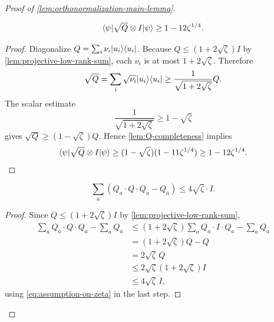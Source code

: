\begin{proof}[Proof of \ref{lem:orthonormalization-main-lemma}]
	\begin{lemma}\label{lem:sqrt-Q-completeness}
		\leanok
		\begin{equation*}
			\langle \psi \rvert \sqrt{Q} \otimes I \lvert \psi \rangle
			\geq
			1 - 12 \zeta^{1/4}.
		\end{equation*}
	\end{lemma}
	\begin{proof}
		\leanok
		Diagonalize $Q=\sum_i \nu_i \lvert u_i \rangle\langle u_i \rvert$. Because $Q \leq (1+2\sqrt{\zeta})I$ by \ref{lem:projective-low-rank-sum}, each $\nu_i$ is at most $1+2\sqrt{\zeta}$. Therefore
		\[
			\sqrt{Q}
			=
			\sum_i \sqrt{\nu_i}\lvert u_i \rangle\langle u_i \rvert
			\geq
			\frac{1}{\sqrt{1+2\sqrt{\zeta}}} Q.
		\]
		The scalar estimate
		\[
			\frac{1}{\sqrt{1+2\sqrt{\zeta}}} \geq 1-\sqrt{\zeta}
		\]
		gives $\sqrt{Q} \geq (1-\sqrt{\zeta})Q$. Hence \ref{lem:Q-completeness} implies
		\[
			\langle \psi \rvert \sqrt{Q} \otimes I \lvert \psi \rangle
			\geq
			(1-\sqrt{\zeta})(1-11\zeta^{1/4})
			\geq
			1-12\zeta^{1/4}.
		\]
	\end{proof}

	\begin{lemma}\label{lem:q-almost-projective}
		\leanok
		\begin{equation*}
			\sum_a (Q_a \cdot Q \cdot Q_a - Q_a) \leq 4\sqrt{\zeta} \cdot I.
		\end{equation*}
	\end{lemma}
	\begin{proof}
		\leanok
		Since $Q \leq (1+2\sqrt{\zeta})I$ by \ref{lem:projective-low-rank-sum},
		\begin{align*}
			\sum_a Q_a \cdot Q \cdot Q_a - \sum_a Q_a
			 & \leq
			(1+2\sqrt{\zeta}) \sum_a Q_a \cdot I \cdot Q_a - \sum_a Q_a \\
			 & =
			(1+2\sqrt{\zeta})Q - Q                                      \\
			 & =
			2\sqrt{\zeta}\,Q                                            \\
			 & \leq
			2\sqrt{\zeta}(1+2\sqrt{\zeta})I                             \\
			 & \leq
			4\sqrt{\zeta}\,I,
		\end{align*}
		using \ref{eq:assumption-on-zeta} in the last step.
	\end{proof}


\end{proof}

